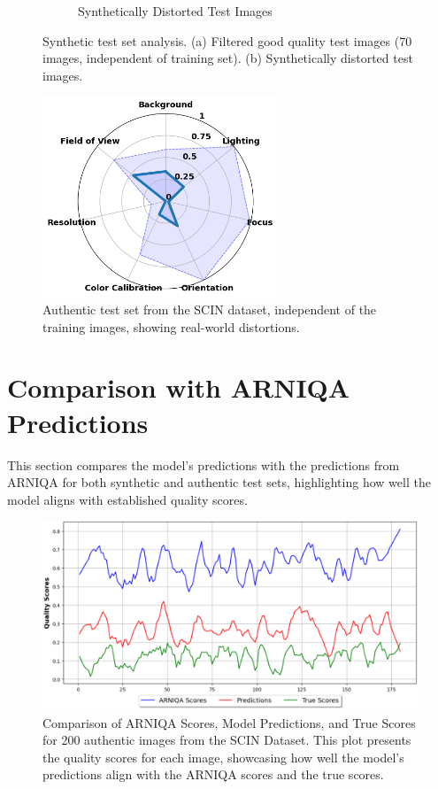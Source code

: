 \begin{figure}[ht]
\begin{subfigure}[b]{0.48\textwidth}
        \caption{Synthetically Distorted Test Images}
        \label{fig:test_70_synthetic}
    \end{subfigure}
    \hfill
    \caption{Synthetic test set analysis. (a) Filtered good quality test images (70 images, independent of training set). (b) Synthetically distorted test images.}
    \label{fig:T1}
\end{figure}

\begin{figure}[ht]
    \centering
    \includegraphics[keepaspectratio,width=7cm]{img/hept/test_200.png}
    \caption{Authentic test set from the SCIN dataset, independent of the training images, showing real-world distortions.}
    \label{fig:T2}
\end{figure}
\clearpage
\section{Comparison with ARNIQA Predictions}
\label{sec:ComparisonARNIQA}
This section compares the model’s predictions with the predictions from ARNIQA for both synthetic and authentic test sets, highlighting how well the model aligns with established quality scores. \par
\begin{figure}[ht]
    \centering
    \includegraphics[keepaspectratio,width=13cm]{img/hept/test_200_arniqa.png}
    \caption{Comparison of ARNIQA Scores, Model Predictions, and True Scores for 200 authentic images from the SCIN Dataset. This plot presents the quality scores for each image, showcasing how well the model’s predictions align with the ARNIQA scores and the true scores.}
    \label{fig:T2A}
\end{figure}

